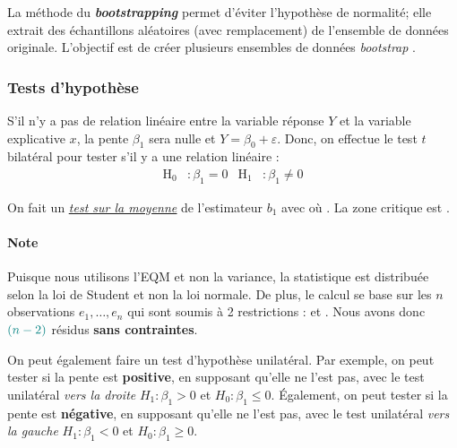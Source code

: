 \documentclass[french]{article}
\begin{document}
\begin{multicols*}{2}
La méthode du \og \textit{\textbf{bootstrapping}} \fg{} permet d'éviter l'hypothèse de normalité; elle extrait des échantillons aléatoires (avec remplacement) de l'ensemble de données originale. L'objectif est de créer plusieurs ensembles de données \og \textit{bootstrap} \fg{}.



\subsubsection{Tests d'hypothèse}
\begin{definitionNOHFILL}
S'il n'y a pas de relation linéaire entre la variable réponse $Y$ et la variable explicative $x$, la pente $\beta_{1}$ sera nulle et $Y = \beta_{0} + \varepsilon$. Donc, on effectue le test $t$ bilatéral pour tester s'il y a une relation linéaire : 
\begin{align*}
	\mathrm{H}_{0}&: \beta_{1} = 0	&
	\mathrm{H}_{1}&: \beta_{1} \neq 0
\end{align*}

\bigskip

On fait un \textit{\color{bleudefrance}\underline{\hyperref[subsec:MeanTests]{\color{bleudefrance} test sur la moyenne}}} de l'estimateur $b_{1}$ avec  où . La zone critique est .

\paragraph{Note}	Puisque nous utilisons l'EQM et non la variance, la statistique est distribuée selon la loi de Student et non la loi normale. De plus, le calcul se base sur les $n$ observations $e_{1}, \dots, e_{n}$ qui sont soumis à 2 restrictions :  et . Nous avons donc $\textcolor{teal}{(n - 2)}$ résidus \textbf{sans contraintes}.
\end{definitionNOHFILL}

\bigskip

\begin{rappel_enhanced}[Contexte]
On peut également faire un test d'hypothèse unilatéral. Par exemple, on peut tester si la pente est \textbf{positive}, en supposant qu'elle ne l'est pas, avec le test unilatéral \textit{vers la droite} $H_{1} : \beta_{1} > 0$ et $H_{0} : \beta_{1} \leq 0$. Également, on peut tester si la pente est \textbf{négative}, en supposant qu'elle ne l'est pas, avec le test unilatéral \textit{vers la gauche} $H_{1} : \beta_{1} < 0$ et $H_{0} : \beta_{1} \geq 0$.
\end{rappel_enhanced}


\end{multicols*}
\end{document}
